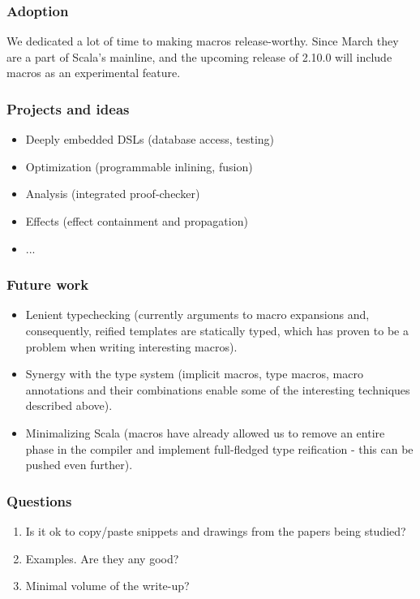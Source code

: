 \documentclass[hyperref={bookmarks=false}]{beamer}
\begin{document}
\begin{frame}[fragile]
\frametitle{Adoption}

We dedicated a lot of time to making macros release-worthy.
Since March they are a part of Scala's mainline, and the upcoming
release of 2.10.0 will include macros as an experimental feature.
\end{frame}

\begin{frame}[fragile]
\frametitle{Projects and ideas}
\begin{itemize}
\item Deeply embedded DSLs (database access, testing)
\item Optimization (programmable inlining, fusion)
\item Analysis (integrated proof-checker)
\item Effects (effect containment and propagation)
\item ...
\end{itemize}
\end{frame}

\begin{frame}[fragile]
\frametitle{Future work}
\begin{itemize}
\item Lenient typechecking (currently arguments to macro expansions and, consequently,
reified templates are statically typed, which has proven to be a problem when writing
interesting macros).
\item Synergy with the type system (implicit macros, type macros, macro annotations
and their combinations enable some of the interesting techniques described above).
\item Minimalizing Scala (macros have already allowed us to remove an entire phase
in the compiler and implement full-fledged type reification - this can be pushed even further).
\end{itemize}
\end{frame}


\begin{frame}[fragile]
\frametitle{Questions}
\begin{enumerate}
\item Is it ok to copy/paste snippets and drawings from the papers being studied?
\item Examples. Are they any good?
\item Minimal volume of the write-up?
\end{enumerate}
\end{frame}
\end{document}
